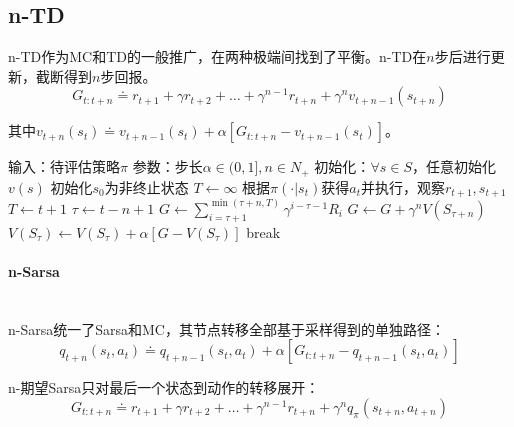 \documentclass[
12pt, %
a4paper, 
oneside, %
headinclude,footinclude, %
]{scrartcl}
\begin{document}
\subsection[n-TD]{n-TD}
n-TD作为MC和TD的一般推广，在两种极端间找到了平衡。n-TD在$ n $步后进行更新，截断得到$ n $步回报。
$$ G_{t:t + n} \doteq r_{t + 1} + \gamma r_{t + 2} + \dots + \gamma^{n - 1} r_{t + n} + \gamma^n v_{t + n - 1}(s_{t + n}) $$

其中$ v_{t + n}(s_t) \doteq v_{t + n - 1}(s_t) + \alpha[G_{t:t + n} - v_{t + n - 1}(s_t)] $。
\begin{myalgorithm}[n-TD]
\State 输入：待评估策略$ \pi $
\State 参数：步长$ \alpha \in (0, 1], n \in N_+ $
\State 初始化：$ \forall s \in S $，任意初始化$ v(s) $
\State 初始化$ s_0 $为非终止状态
\State $ T \gets \infty $
\State 根据$ \pi(\cdot|s_t) $获得$ a_t $并执行，观察$ r_{t + 1}, s_{t + 1} $
\State $ T \gets t + 1 $
\EndIf
\EndIf
\State $ \tau \gets t - n + 1 $ 
\State $ G \gets \sum_{i = \tau + 1}^{\min(\tau + n,T)} \gamma^{i - \tau - 1}R_i $
\State $ G \gets G + \gamma^n V(S_{\tau + n}) $
\EndIf
\State $ V(S_{\tau}) \gets V(S_{\tau}) + \alpha[G - V(S_{\tau})] $
\EndIf
{}
\State break
\EndIf
\EndFor
\EndFor
\end{myalgorithm}

\paragraph{n-Sarsa}~\\

n-Sarsa统一了Sarsa和MC，其节点转移全部基于采样得到的单独路径：
$$ q_{t + n}(s_t, a_t) \doteq q_{t + n - 1}(s_t, a_t) + \alpha [G_{t:t + n} - q_{t + n - 1}(s_t, a_t)] $$

n-期望Sarsa只对最后一个状态到动作的转移展开：
$$ G_{t:t + n} \doteq r_{t + 1} + \gamma r_{t + 2} + \dots + \gamma^{n - 1} r_{t + n} + \gamma^n q_{\pi}(s_{t + n}, a_{t + n}) $$
\end{document}
